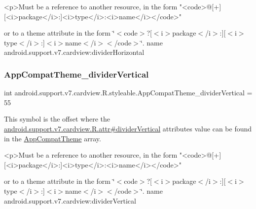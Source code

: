 \begin{DoxyVerb}      <p>Must be a reference to another resource, in the form "<code>@[+][<i>package</i>:]<i>type</i>:<i>name</i></code>"
\end{DoxyVerb}
 or to a theme attribute in the form \char`\"{}$<$code$>$?\mbox{[}$<$i$>$package$<$/i$>$\+:\mbox{]}\mbox{[}$<$i$>$type$<$/i$>$\+:\mbox{]}$<$i$>$name$<$/i$>$$<$/code$>$\char`\"{}.  name android.\+support.\+v7.\+cardview\+:divider\+Horizontal \mbox{\label{classandroid_1_1support_1_1v7_1_1cardview_1_1R_1_1styleable_a0c1aaaa486728e1316ec4549d70827f9}} 
\subsubsection{\texorpdfstring{App\+Compat\+Theme\+\_\+divider\+Vertical}{AppCompatTheme\_dividerVertical}}
{\footnotesize\ttfamily int android.\+support.\+v7.\+cardview.\+R.\+styleable.\+App\+Compat\+Theme\+\_\+divider\+Vertical = 55\hspace{0.3cm}{\ttfamily [static]}}

This symbol is the offset where the \hyperlink{classandroid_1_1support_1_1v7_1_1cardview_1_1R_1_1attr_a2909e331e64b74973dbf1b900fdc882a}{android.\+support.\+v7.\+cardview.\+R.\+attr\#divider\+Vertical} attribute\textquotesingle{}s value can be found in the \hyperlink{classandroid_1_1support_1_1v7_1_1cardview_1_1R_1_1styleable_a52e6f69f954ecc2622d72c0b4d298938}{App\+Compat\+Theme} array.

\begin{DoxyVerb}      <p>Must be a reference to another resource, in the form "<code>@[+][<i>package</i>:]<i>type</i>:<i>name</i></code>"
\end{DoxyVerb}
 or to a theme attribute in the form \char`\"{}$<$code$>$?\mbox{[}$<$i$>$package$<$/i$>$\+:\mbox{]}\mbox{[}$<$i$>$type$<$/i$>$\+:\mbox{]}$<$i$>$name$<$/i$>$$<$/code$>$\char`\"{}.  name android.\+support.\+v7.\+cardview\+:divider\+Vertical \mbox{\label{classandroid_1_1support_1_1v7_1_1cardview_1_1R_1_1styleable_afaa8a297c466030001f56355b8189813}} 
